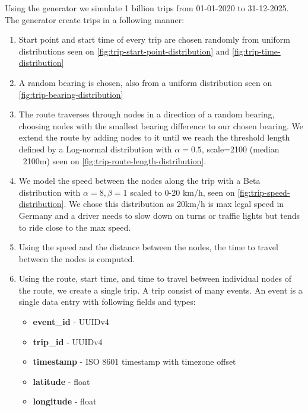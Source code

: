 Using the generator we simulate 1 billion trips from 01-01-2020 to 31-12-2025.
The generator create trips in a following manner:
\begin{enumerate}
  \item Start point and start time of every trip are chosen randomly from uniform distributions seen on \cref{fig:trip-start-point-distribution} and \cref{fig:trip-time-distribution}
  \item A random bearing is chosen, also from a uniform distribution seen on \cref{fig:trip-bearing-distribution}
  \item The route traverses through nodes in a direction of a random bearing, choosing nodes with the smallest bearing difference to our chosen bearing.
    We extend the route by adding nodes to it until we reach the threshold length defined by a Log-normal distribution with $\alpha=0.5$, scale=2100 (median ~2100m) seen on \cref{fig:trip-route-length-distribution}.
  \item We model the speed between the nodes along the trip with a Beta distribution with $\alpha=8, \beta=1$ scaled to 0-20 km/h, seen on \cref{fig:trip-speed-distribution}.
    We chose this distribution as 20km/h is max legal speed in Germany and a driver needs to slow down on turns or traffic lights but tends to ride close to the max speed.
  \item Using the speed and the distance between the nodes, the time to travel between the nodes is computed.
  \item Using the route, start time, and time to travel between individual nodes of the route, we create a single trip.
    A trip consist of many events.
    An event is a single data entry with following fields and types:
    \begin{itemize}
      \item \textbf{event\_id} - UUIDv4
      \item \textbf{trip\_id} - UUIDv4
      \item \textbf{timestamp} - ISO 8601 timestamp with timezone offset
      \item \textbf{latitude} - float
      \item \textbf{longitude} - float
    \end{itemize}
\end{enumerate}

